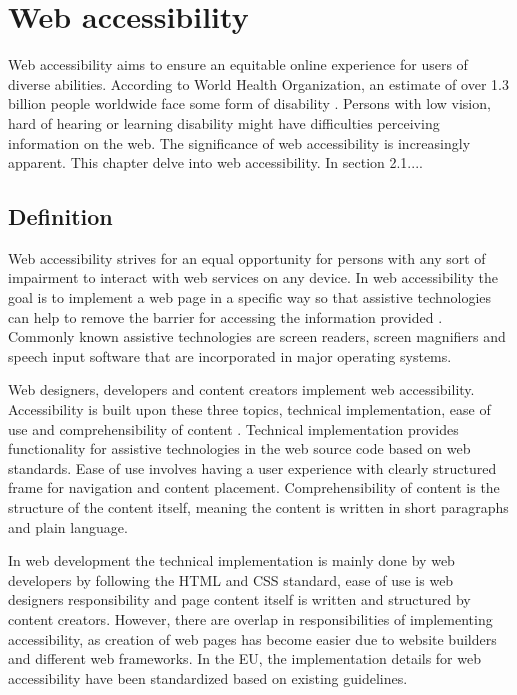 \chapter{Web accessibility\label{accessibility}}

Web accessibility aims to ensure an equitable online experience for users of diverse abilities. According to World Health Organization, an estimate of over 1.3 billion people worldwide face some form of disability \citep{whodisability}. Persons with low vision, hard of hearing or learning disability might have difficulties perceiving information on the web. The significance of web accessibility is increasingly apparent. This chapter delve into web accessibility. In section 2.1....

\section{Definition}

Web accessibility strives for an equal opportunity for persons with any sort of impairment to interact with web services on any device. In web accessibility the goal is to implement a web page in a specific way so that assistive technologies can help to remove the barrier for accessing the information provided \citep{webaccessibilitydefinition}. Commonly known assistive technologies are screen readers, screen magnifiers and speech input software that are incorporated in major operating systems.

Web designers, developers and content creators implement web accessibility. Accessibility is built upon these three topics, technical implementation, ease of use and comprehensibility of content \citep{webaccessibilitydefinition}. Technical implementation provides functionality for assistive technologies in the web source code based on web standards. Ease of use involves having a user experience with clearly structured frame for navigation and content placement. Comprehensibility of content is the structure of the content itself, meaning the content is written in short paragraphs and plain language. 

In web development the technical implementation is mainly done by web developers by following the HTML and CSS standard, ease of use is web designers responsibility and page content itself is written and structured by content creators. However, there are overlap in responsibilities of implementing accessibility, as creation of web pages has become easier due to website builders and different web frameworks. In the EU, the implementation details for web accessibility have been standardized based on existing guidelines.

